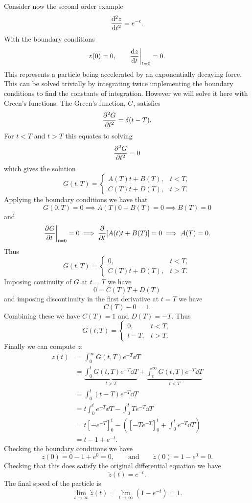 \documentclass[a4paper]{article}
\begin{document}
    Consider now the second order example
    \[\dv[2]{z}{t} = e^{-t}.\]
    With the boundary conditions
    \[z(0) = 0, \qquad \dv[]{z}{t}\biggr|_{t=0} = 0.\]
    This represents a particle being accelerated by an exponentially decaying force.
    This can be solved trivially by integrating twice implementing the boundary conditions to find the constants of integration.
    However we will solve it here with Green's functions.
    The Green's function, \(G\), satisfies
    \[\pdv[2]{G}{t} = \delta(t - T).\]
    For \(t < T\) and \(t > T\) this equates to solving
    \[\pdv[2]{G}{t} = 0\]
    which gives the solution
    \[
        G(t, T) =
        \begin{cases}
            A(T)t + B(T), & t < T,\\
            C(T)t + D(T), & t > T.
        \end{cases}
    \]
    Applying the boundary conditions we have that
    \[G(0, T) = 0 \implies A(T)0 + B(T) = 0 \implies B(T) = 0\]
    and
    \[\pdv[]{G}{t}\biggr|_{t=0} = 0 \implies \pdv{t}[A(t)t + B(T)] = 0 \implies A(T) = 0.\]
    Thus
    \[
        G(t, T) =
        \begin{cases}
            0, & t < T,\\
            C(T)t + D(T), & t > T.
        \end{cases}
    \]
    Imposing continuity of \(G\) at \(t = T\) we have
    \[0 = C(T)T + D(T)\]
    and imposing discontinuity in the first derivative at \(t = T\) we have
    \[C(T) - 0 = 1.\]
    Combining these we have \(C(T) = 1\) and \(D(T) = -T\).
    Thus
    \[
        G(t, T) =
        \begin{cases}
            0, & t < T,\\
            t - T, & t > T.
        \end{cases}
    \]
    Finally we can compute \(z\):
    \begin{align*}
        z(t) &= \int_{0}^{\infty} G(t, T)e^{-T}\dd{T}\\
        &= \underbrace{\int_0^t G(t, T)e^{-T}\dd{T}}_{t > T} + \underbrace{\int_{t}^{\infty} G(t, T)e^{-T}\dd{T}}_{t < T}\\
        &= \int_0^t (t - T)e^{-T}\dd{T}\\
        &= t\int_0^t e^{-T}\dd{T} - \int_0^t Te^{-T}\dd{T}\\
        &= t[-e^{-T}]_0^t - \left([-Te^{-T}]_0^t + \int_0^te^{-T}\dd{T}\right)\\
        &= t - 1 + e^{-t}.
    \end{align*}
    Checking the boundary conditions we have
    \[z(0) = 0 - 1 + e^0 = 0, \qquad\text{and}\qquad \dot{z}(0) = 1 - e^0 = 0.\]
    Checking that this does satisfy the original differential equation we have
    \[\ddot{z}(t) = e^{-t}.\]
    The final speed of the particle is
    \[\lim_{t\to\infty}\dot{z}(t) = \lim_{t\to\infty} (1 - e^{-t}) = 1.\]
    
\end{document}

